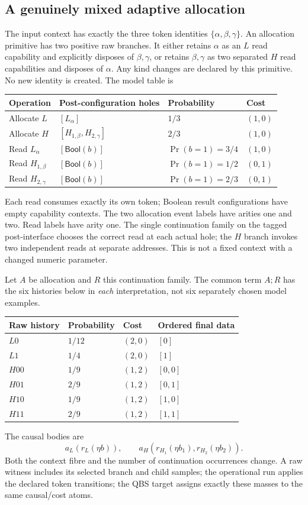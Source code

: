 \documentclass[11pt,a4paper]{article}
\theoremstyle{definition}
\begin{document}
\subsection{A genuinely mixed adaptive allocation}
The input context has exactly the three token identities
$\{\alpha,\beta,\gamma\}$. An allocation primitive has two positive raw
branches. It either retains $\alpha$ as an $L$ read capability and explicitly
disposes of $\beta,\gamma$, or retains $\beta,\gamma$ as two separated $H$
read capabilities and disposes of $\alpha$. Any kind changes are declared
by this primitive. No new identity is created. The model table is
\begin{center}
\begin{tabular}{@{}llll@{}}
\toprule
Operation&Post-configuration holes&Probability&Cost\\
\midrule
Allocate $L$&$[L_\alpha]$&$1/3$&$(1,0)$\\
Allocate $H$&$[H_{1,\beta},H_{2,\gamma}]$&$2/3$&$(1,0)$\\
Read $L_\alpha$&$[\mathsf{Bool}(b)]$&$\Pr(b=1)=3/4$&$(1,0)$\\
Read $H_{1,\beta}$&$[\mathsf{Bool}(b)]$&$\Pr(b=1)=1/2$&$(0,1)$\\
Read $H_{2,\gamma}$&$[\mathsf{Bool}(b)]$&$\Pr(b=1)=2/3$&$(0,1)$\\
\bottomrule
\end{tabular}
\end{center}
Each read consumes exactly its own token; Boolean result configurations
have empty capability contexts. The two allocation event labels have
arities one and two. Read labels have arity one. The single continuation
family on the tagged post-interface chooses the correct read at each
actual hole; the $H$ branch invokes two independent reads at separate
addresses. This is not a fixed context with a changed numeric parameter.

Let $A$ be allocation and $R$ this continuation family. The common term
$A;R$ has the six histories below in \emph{each} interpretation, not six
separately chosen model examples.
\begin{center}
\begin{tabular}{@{}llll@{}}
\toprule
Raw history&Probability&Cost&Ordered final data\\
\midrule
$L0$&$1/12$&$(2,0)$&$[0]$\\
$L1$&$1/4$&$(2,0)$&$[1]$\\
$H00$&$1/9$&$(1,2)$&$[0,0]$\\
$H01$&$2/9$&$(1,2)$&$[0,1]$\\
$H10$&$1/9$&$(1,2)$&$[1,0]$\\
$H11$&$2/9$&$(1,2)$&$[1,1]$\\
\bottomrule
\end{tabular}
\end{center}
The causal bodies are
\[
 a_L(r_L(\eta b)),\qquad
 a_H(r_{H_1}(\eta b_1),r_{H_2}(\eta b_2)).
\]
Both the context fibre and the number of continuation occurrences change.
A raw witness includes its selected branch and child samples; the operational
run applies the declared token transitions; the QBS target assigns exactly
these masses to the same causal/cost atoms.
\end{document}
